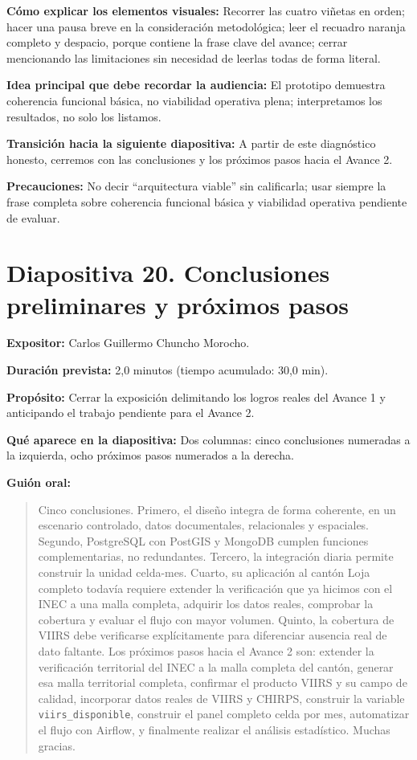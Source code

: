 \documentclass[11pt,a4paper]{article}
\newcommand{\campo}[2]{\par\medskip\noindent\textbf{#1:} #2\par}
\newenvironment{guionoral}{%
  \medskip\noindent\textbf{Gui\'on oral:}\par\smallskip
  \begin{quote}\small
}{%
  \end{quote}
}
\newcommand{\separadordiapositiva}{\bigskip\noindent{\color{Tierra!60}\hrulefill}\bigskip}
\begin{document}
\campo{C\'omo explicar los elementos visuales}{Recorrer las cuatro
vi\~netas en orden; hacer una pausa breve en la consideraci\'on
metodol\'ogica; leer el recuadro naranja completo y despacio, porque
contiene la frase clave del avance; cerrar mencionando las
limitaciones sin necesidad de leerlas todas de forma literal.}
\campo{Idea principal que debe recordar la audiencia}{El prototipo
demuestra coherencia funcional b\'asica, no viabilidad operativa
plena; interpretamos los resultados, no solo los listamos.}
\campo{Transici\'on hacia la siguiente diapositiva}{A partir de este
diagn\'ostico honesto, cerremos con las conclusiones y los pr\'oximos
pasos hacia el Avance 2.}
\campo{Precauciones}{No decir ``arquitectura viable'' sin calificarla;
usar siempre la frase completa sobre coherencia funcional b\'asica y
viabilidad operativa pendiente de evaluar.}

\separadordiapositiva

\section*{Diapositiva 20. Conclusiones preliminares y pr\'oximos pasos}

\campo{Expositor}{Carlos Guillermo Chuncho Morocho.}
\campo{Duraci\'on prevista}{2,0 minutos (tiempo acumulado: 30,0 min).}
\campo{Prop\'osito}{Cerrar la exposici\'on delimitando los logros
reales del Avance 1 y anticipando el trabajo pendiente para el Avance
2.}
\campo{Qu\'e aparece en la diapositiva}{Dos columnas: cinco
conclusiones numeradas a la izquierda, ocho pr\'oximos pasos numerados
a la derecha.}

\begin{guionoral}
Cinco conclusiones. Primero, el dise\~no integra de forma coherente, en
un escenario controlado, datos documentales, relacionales y espaciales.
Segundo, PostgreSQL con PostGIS y MongoDB cumplen funciones
complementarias, no redundantes. Tercero, la integraci\'on diaria
permite construir la unidad celda-mes. Cuarto, su aplicaci\'on al
cant\'on Loja completo todav\'ia requiere extender la verificaci\'on
que ya hicimos con el INEC a una malla completa, adquirir los datos
reales, comprobar la cobertura y evaluar el flujo con mayor volumen.
Quinto, la cobertura de VIIRS debe verificarse expl\'icitamente para
diferenciar ausencia real de dato faltante. Los pr\'oximos pasos hacia
el Avance 2 son: extender la verificaci\'on territorial del INEC a la
malla completa del cant\'on, generar esa malla territorial completa,
confirmar el producto VIIRS y su campo de calidad, incorporar datos
reales de VIIRS y CHIRPS, construir la variable
\texttt{viirs\_disponible}, construir el panel completo celda por mes,
automatizar el flujo con Airflow, y finalmente realizar el an\'alisis
estad\'istico. Muchas gracias.
\end{guionoral}
\end{document}
